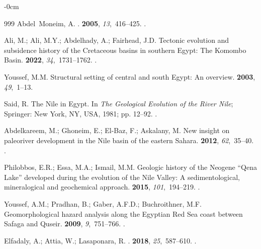\documentclass[information,article,accept,pdftex,moreauthors]{Definitions/mdpi}
\begin{document}
\begin{adjustwidth}{-\extralength}{0cm}
\begin{thebibliography}{999}
Abdel~Moneim, A.
.
 {\bf 2005}, {\em 13},~416--425.
.

Ali, M.; Ali, M.Y.; Abdelhady, A.; Fairhead, J.D.
\newblock Tectonic evolution and subsidence history of the Cretaceous basins in
  southern Egypt: The Komombo Basin.
 {\bf 2022}, {\em 34},~1731--1762.
.

Youssef, M.M.
\newblock Structural setting of central and south Egypt: An overview.
 {\bf 2003}, {\em 49},~1--13.

Said, R. The Nile in Egypt.
\newblock In {\em The Geological Evolution of the River Nile}; Springer: New York, NY, USA, 1981; pp. 12--92.
.

Abdelkareem, M.; Ghoneim, E.; El-Baz, F.; Askalany, M.
\newblock New insight on paleoriver development in the Nile basin of the
  eastern Sahara.
 {\bf 2012}, {\em 62},~35--40.
.

Philobbos, E.R.; Essa, M.A.; Ismail, M.M.
\newblock Geologic history of the Neogene “Qena Lake” developed during the
  evolution of the Nile Valley: A sedimentological, mineralogical and
  geochemical approach.
 {\bf 2015}, {\em
  101},~194--219.
.

Youssef, A.M.; Pradhan, B.; Gaber, A.F.D.; Buchroithner, M.F.
\newblock Geomorphological hazard analysis along the Egyptian Red Sea coast
  between Safaga and Quseir.
 {\bf 2009}, {\em
  9},~751--766.
.

Elfadaly, A.; Attia, W.; Lasaponara, R.
.
 {\bf 2018}, {\em
  25},~587--610.
.


\end{thebibliography}
\end{adjustwidth}
\end{document}

